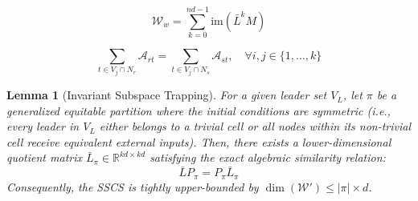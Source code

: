 \documentclass[10pt,a4paper]{amsart}
\newtheorem{lemma}{Lemma}
\begin{document}
	\begin{equation}
		\mathcal{W}_{w} = \sum_{k=0}^{nd-1} \text{im}\left( \bar{L}^k M \right) \label{eq:krylov}
	\end{equation}

		\begin{equation}
			\sum_{t \in V_{j} \cap N_r} \mathcal{A}_{rt} = \sum_{t \in V_{j} \cap N_s} \mathcal{A}_{st}, \quad \forall i, j \in \{1,\dots,k\} \label{eq:ep_def}
		\end{equation}

	\begin{lemma}[Invariant Subspace Trapping]
		For a given leader set $V_L$, let $\pi$ be a generalized equitable partition where the initial conditions are symmetric (i.e., every leader in $V_L$ either belongs to a trivial cell or all nodes within its non-trivial cell receive equivalent external inputs). Then, there exists a lower-dimensional quotient matrix $\bar{L}_\pi \in \mathbb{R}^{kd \times kd}$ satisfying the exact algebraic similarity relation:
		\begin{equation}
			\bar{L} P_\pi = P_\pi \bar{L}_\pi \label{eq:quotient}
		\end{equation}
		Consequently, the SSCS is tightly upper-bounded by $\dim(\mathcal{W}') \le |\pi| \times d$.
	\end{lemma}
\end{document}
